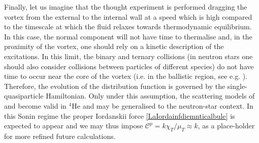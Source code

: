 \documentclass[preprints,article,accept,moreauthors,pdftex]{mdpi}
\begin{document}
Finally, let us imagine that the thought experiment is performed dragging the vortex from the external to the internal wall at a speed which is high compared to the timescale at which the fluid relaxes towards thermodynamic equilibrium. In this case, the normal component will not have time to thermalise and, in the proximity of the vortex, one should rely on a kinetic description of the excitations. In this limit, the  binary and ternary collisions (in neutron stars one should also consider  collisions between particles of different species) do not have time to occur near the core of the vortex (i.e. in the ballistic region, see e.g. \cite{sonin_book_2016}). Therefore, the evolution of the  distribution function is governed by the single-quasiparticle Hamiltonian. Only under this assumption, the scattering models of \citet{sonin_book_2016} and \citet{stone2000} become valid in $^4$He and may be generalised to the neutron-star context. In this Sonin regime the proper Iordanskii force \eqref{LaIordainfdiemnticalbule} is expected to appear and we may thus impose $\mathcal{C}^p = k \chi_T/\mu_T \approx k$, as a place-holder for more refined future calculations.

\end{document}
